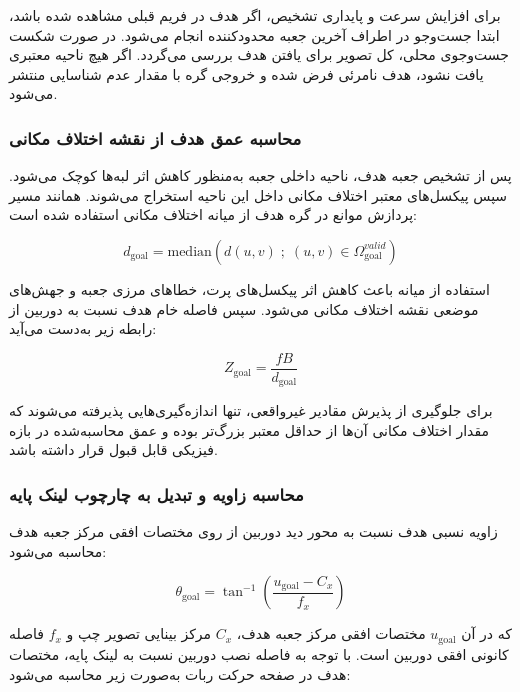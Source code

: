 برای افزایش سرعت و پایداری تشخیص، اگر هدف در فریم قبلی مشاهده شده باشد، ابتدا جست‌وجو در اطراف آخرین جعبه محدودکننده انجام می‌شود. در صورت شکست جست‌وجوی محلی، کل تصویر برای یافتن هدف بررسی می‌گردد. اگر هیچ ناحیه معتبری یافت نشود، هدف نامرئی فرض شده و خروجی گره با مقدار عدم شناسایی منتشر می‌شود.

\subsubsection{محاسبه عمق هدف از نقشه اختلاف مکانی}

پس از تشخیص جعبه هدف، ناحیه داخلی جعبه به‌منظور کاهش اثر لبه‌ها کوچک می‌شود. سپس پیکسل‌های معتبر اختلاف مکانی داخل این ناحیه استخراج می‌شوند. همانند مسیر پردازش موانع در گره هدف از میانه اختلاف مکانی استفاده شده است:

\begin{equation}
	d_{\mathrm{goal}} =
	\mathrm{median}
	\left(
	d(u,v) \; ; \; (u,v)\in\Omega_{\mathrm{goal}}^{valid}
	\right)
	\label{eq:goal_median_disparity}
\end{equation}

استفاده از میانه باعث کاهش اثر پیکسل‌های پرت، خطاهای مرزی جعبه و جهش‌های موضعی نقشه اختلاف مکانی می‌شود. سپس فاصله خام هدف نسبت به دوربین از رابطه زیر به‌دست می‌آید:

\begin{equation}
	Z_{\mathrm{goal}} =
	\frac{fB}{d_{\mathrm{goal}}}
	\label{eq:goal_raw_depth}
\end{equation}

برای جلوگیری از پذیرش مقادیر غیرواقعی، تنها اندازه‌گیری‌هایی پذیرفته می‌شوند که مقدار اختلاف مکانی آن‌ها از حداقل معتبر بزرگ‌تر بوده و عمق محاسبه‌شده در بازه فیزیکی قابل قبول قرار داشته باشد.

\subsubsection{محاسبه زاویه و تبدیل به چارچوب لینک پایه}

زاویه نسبی هدف نسبت به محور دید دوربین از روی مختصات افقی مرکز جعبه هدف محاسبه می‌شود:

\begin{equation}
	\theta_{\mathrm{goal}} =
	\tan^{-1}
	\left(
	\frac{u_{\mathrm{goal}}-C_x}{f_x}
	\right)
	\label{eq:goal_camera_bearing}
\end{equation}

که در آن \(u_{\mathrm{goal}}\) مختصات افقی مرکز جعبه هدف، \(C_x\) مرکز بینایی تصویر چپ و \(f_x\) فاصله کانونی افقی دوربین است. با توجه به فاصله نصب دوربین نسبت به لینک پایه، مختصات هدف در صفحه حرکت ربات به‌صورت زیر محاسبه می‌شود:

